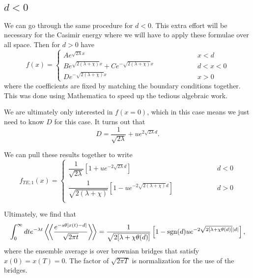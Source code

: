\subsection{$d<0$}
We can go through the same procedure for $d<0$.  This extra effort will be necessary for the Casimir energy where we will have to apply these formulae over all space.    
Then for $d>0$ have 
\begin{equation}
f(x) =\left\{ 
\begin{array}{lcr}  A e^{\sqrt{2\lambda} x} & \hspace{2cm} & x<d\\
B e^{\sqrt{2(\lambda+\chi)}x} + Ce^{-\sqrt{2(\lambda+\chi)}x} & \hspace{2cm} & d<x<0\\
D e^{-\sqrt{2(\lambda+\chi)}x} & \hspace{2cm} & x>0
\end{array}
\right.
\end{equation}
where the coefficients are fixed by matching the boundary conditions together.  This was done using Mathematica to speed up the tedious algebraic work.  

We are ultimately only interested in $f(x=0)$, which in this case means we just need to know $D$ for this case.  It turns out that 
\begin{equation}
D = \frac{1}{\sqrt{2\lambda}} + u e^{2\sqrt{2\lambda}d}.
\end{equation}

We can pull these results together to write
\begin{equation}
f_{TE,1}(x) = \left\{\begin{array}{lcr} 
\dfrac{1}{\sqrt{2\lambda}}\left[1+ u e^{-2\sqrt{2\lambda}d}\right]  & \hspace{2cm} & d<0\\
\dfrac{1}{\sqrt{2(\lambda+\chi)}}\left[1 - u e^{-2\sqrt{2(\lambda+\chi)}d}\right] & \hspace{2cm} & d>0\\
\end{array} \right. 
\end{equation}

Ultimately, we find that 
\begin{equation}
\int_0^\infty dt e^{-\lambda t} \left\langle\!\left\langle \frac{e^{-s \theta[x(t)-d]}}{\sqrt{2\pi t}}\right\rangle\!\right\rangle  = \frac{1}{\sqrt{2[\lambda+\chi\theta(d)]}}\left[1 - \mathrm{sgn}(d) u e^{-2\sqrt{2[\lambda+\chi\theta(d)]}|d|}\right],\label{eq:Feynman-Kac TE one step}
\end{equation}
where the ensemble average is over brownian bridges that satisfy $x(0)=x(T)=0$.  The factor of $\sqrt{2\pi T}$ is normalization for the use of the bridges.  

